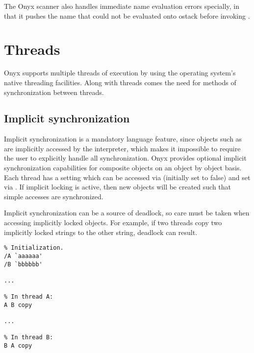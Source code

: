 The Onyx scanner also handles immediate name evaluation errors specially, in
that it pushes the name that could not be evaluated onto ostack before invoking
.

\section{Threads}

Onyx supports multiple threads of execution by using the operating system's
native threading facilities.  Along with threads comes the need for methods of
synchronization between threads.

\subsection{Implicit synchronization}
\label{sec:implicit_synchronization}

Implicit synchronization is a mandatory language feature, since objects such as
 are implicitly accessed by the
interpreter, which makes it impossible to require the user to explicitly handle
all synchronization.  Onyx provides optional implicit synchronization
capabilities for composite objects on an object by object basis.  Each thread
has a setting which can be accessed via
 (initially set
to false) and set via .
If implicit locking is active, then new objects will be created such that simple
accesses are synchronized.

Implicit synchronization can be a source of deadlock, so care must be taken when
accessing implicitly locked objects.  For example, if two threads copy two
implicitly locked strings to the other string, deadlock can result.

\begin{verbatim}
% Initialization.
/A `aaaaaa'
/B `bbbbbb'

...

% In thread A:
A B copy

...

% In thread B:
B A copy
\end{verbatim}

